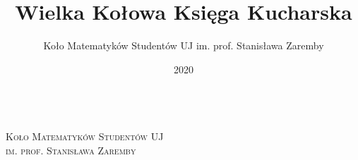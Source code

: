 \documentclass[12pt,a4paper]{book}
\title{Wielka Kołowa Księga Kucharska}
\author{Koło Matematyków Studentów UJ im. prof. Stanisława Zaremby}
\date{2020}
\begin{document}
	\begin{titlepage}
		\begin{center}
			\vspace*{200pt}
			{\huge\bfseries \MyTitle}\\
			\vspace{1.5cm}
			\textsc{\Large{{Koło Matematyków Studentów UJ\\im. prof. Stanisława Zaremby}}} \\[5pt]
			\vfill
			{\the\year}
		\end{center}
	\end{titlepage}

	\tableofcontents
	
	
	
	
	
\end{document}
